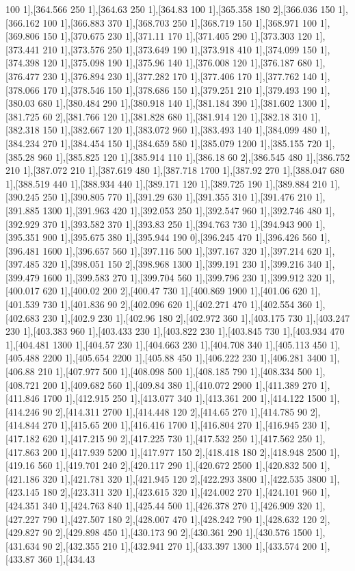 {100 1],[364.566 250 1],[364.63 250 1],[364.83 100 1],[365.358 180 2],[366.036 150 1],[366.162 100 1],[366.883 370 1],[368.703 250 1],[368.719 150 1],[368.971 100 1],[369.806 150 1],[370.675 230 1],[371.11 170 1],[371.405 290 1],[373.303 120 1],[373.441 210 1],[373.576 250 1],[373.649 190 1],[373.918 410 1],[374.099 150 1],[374.398 120 1],[375.098 190 1],[375.96 140 1],[376.008 120 1],[376.187 680 1],[376.477 230 1],[376.894 230 1],[377.282 170 1],[377.406 170 1],[377.762 140 1],[378.066 170 1],[378.546 150 1],[378.686 150 1],[379.251 210 1],[379.493 190 1],[380.03 680 1],[380.484 290 1],[380.918 140 1],[381.184 390 1],[381.602 1300 1],[381.725 60 2],[381.766 120 1],[381.828 680 1],[381.914 120 1],[382.18 310 1],[382.318 150 1],[382.667 120 1],[383.072 960 1],[383.493 140 1],[384.099 480 1],[384.234 270 1],[384.454 150 1],[384.659 580 1],[385.079 1200 1],[385.155 720 1],[385.28 960 1],[385.825 120 1],[385.914 110 1],[386.18 60 2],[386.545 480 1],[386.752 210 1],[387.072 210 1],[387.619 480 1],[387.718 1700 1],[387.92 270 1],[388.047 680 1],[388.519 440 1],[388.934 440 1],[389.171 120 1],[389.725 190 1],[389.884 210 1],[390.245 250 1],[390.805 770 1],[391.29 630 1],[391.355 310 1],[391.476 210 1],[391.885 1300 1],[391.963 420 1],[392.053 250 1],[392.547 960 1],[392.746 480 1],[392.929 370 1],[393.582 370 1],[393.83 250 1],[394.763 730 1],[394.943 900 1],[395.351 900 1],[395.675 380 1],[395.944 190 0],[396.245 470 1],[396.426 560 1],[396.481 1600 1],[396.657 560 1],[397.116 500 1],[397.167 320 1],[397.214 620 1],[397.485 320 1],[398.051 150 2],[398.968 1300 1],[399.191 230 1],[399.216 340 1],[399.479 1600 1],[399.583 270 1],[399.704 560 1],[399.796 230 1],[399.912 320 1],[400.017 620 1],[400.02 200 2],[400.47 730 1],[400.869 1900 1],[401.06 620 1],[401.539 730 1],[401.836 90 2],[402.096 620 1],[402.271 470 1],[402.554 360 1],[402.683 230 1],[402.9 230 1],[402.96 180 2],[402.972 360 1],[403.175 730 1],[403.247 230 1],[403.383 960 1],[403.433 230 1],[403.822 230 1],[403.845 730 1],[403.934 470 1],[404.481 1300 1],[404.57 230 1],[404.663 230 1],[404.708 340 1],[405.113 450 1],[405.488 2200 1],[405.654 2200 1],[405.88 450 1],[406.222 230 1],[406.281 3400 1],[406.88 210 1],[407.977 500 1],[408.098 500 1],[408.185 790 1],[408.334 500 1],[408.721 200 1],[409.682 560 1],[409.84 380 1],[410.072 2900 1],[411.389 270 1],[411.846 1700 1],[412.915 250 1],[413.077 340 1],[413.361 200 1],[414.122 1500 1],[414.246 90 2],[414.311 2700 1],[414.448 120 2],[414.65 270 1],[414.785 90 2],[414.844 270 1],[415.65 200 1],[416.416 1700 1],[416.804 270 1],[416.945 230 1],[417.182 620 1],[417.215 90 2],[417.225 730 1],[417.532 250 1],[417.562 250 1],[417.863 200 1],[417.939 5200 1],[417.977 150 2],[418.418 180 2],[418.948 2500 1],[419.16 560 1],[419.701 240 2],[420.117 290 1],[420.672 2500 1],[420.832 500 1],[421.186 320 1],[421.781 320 1],[421.945 120 2],[422.293 3800 1],[422.535 3800 1],[423.145 180 2],[423.311 320 1],[423.615 320 1],[424.002 270 1],[424.101 960 1],[424.351 340 1],[424.763 840 1],[425.44 500 1],[426.378 270 1],[426.909 320 1],[427.227 790 1],[427.507 180 2],[428.007 470 1],[428.242 790 1],[428.632 120 2],[429.827 90 2],[429.898 450 1],[430.173 90 2],[430.361 290 1],[430.576 1500 1],[431.634 90 2],[432.355 210 1],[432.941 270 1],[433.397 1300 1],[433.574 200 1],[433.87 360 1],[434.43 }
